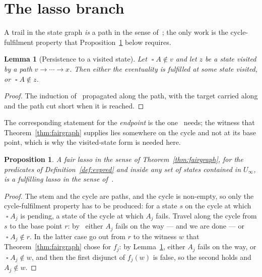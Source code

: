 \documentclass[11pt,a4paper]{article}
\newtheorem{lemma}[theorem]{Lemma}
\newtheorem{proposition}[theorem]{Proposition}
\theoremstyle{definition}
\newcommand{\Always}{\mathop{\square}}
\begin{document}
\section{The lasso branch}\label{sec:lasso}

A trail in the state graph \emph{is} a path in the sense of~\cite[\S5]{m4}; the
only work is the cycle-fulfilment property that
Proposition~\ref{prop:lasso5.3} below requires.

\begin{lemma}[Persistence to a visited state]\label{lem:persistto}
Let $\Always A\notin v$ and let $z$ be a state visited by a path
$v\to\cdots\to x$.  Then either the eventuality is fulfilled at some state
visited, or $\Always A\notin z$.
\end{lemma}

\begin{proof}
The induction of~\cite[Lem.~2.8]{m4} propagated along the path, with the target
carried along and the path cut short when it is reached.
\end{proof}

The corresponding statement for the \emph{endpoint} is the one~\cite{m4} needs;
the witness that Theorem~\ref{thm:fairgraph} supplies lies somewhere on the
cycle and not at its base point, which is why the visited-state form is needed
here.

\begin{proposition}\label{prop:lasso5.3}
A fair lasso in the sense of Theorem~\ref{thm:fairgraph}, for the predicates of
Definition~\ref{def:evpred} and inside any set of states contained in
$U_\infty$, is a fulfilling lasso in the sense of~\cite[Prop.~5.3]{m4}.
\end{proposition}

\begin{proof}
The stem and the cycle are paths, and the cycle is non-empty, so only the
cycle-fulfilment property has to be produced: for a state $s$ on the cycle at
which $\Always A_j$ is pending, a state of the cycle at which $A_j$ fails.
Travel along the cycle from $s$ to the base point $r$: by~\cite[Lem.~2.8]{m4}
either $A_j$ fails on the way --- and we are done --- or $\Always A_j\notin r$.
In the latter case go out from $r$ to the witness $w$ that
Theorem~\ref{thm:fairgraph} chose for $f_j$: by Lemma~\ref{lem:persistto},
either $A_j$ fails on the way, or $\Always A_j\notin w$, and then the first
disjunct of $f_j(w)$ is false, so the second holds and $A_j\notin w$.
\end{proof}
\end{document}
